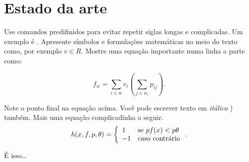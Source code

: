 \pagestyle{fancy}

\chapter{Estado da arte}
\label{cap3}

Use comandos predifinidos para evitar repetir siglas longas e complicadas. Um
exemplo é \hws{}. Apresente símbolos e formulações matemáticas no meio do texto
como, por exemplo $v \in R$. Mostre uma equação importante numa linha a parte
como:

\begin{equation}
	f_w = \sum_{i \in w} v_i (\sum_{j \in w_i} p_{ij}).
\end{equation}

Note o ponto final na equação acima. Você pode escrever texto em \textit{itálico
}) também. Mais uma equação complicadinha a seguir.
\begin{equation}
	h(x, f, p, \theta) =
	\left\{
		\begin{array}{l l}
			1 & \text{se } pf(x) < p\theta\\
			-1 & \text{caso contrário}\\
		\end{array}
	\right. .
\end{equation}

É isso\ldots